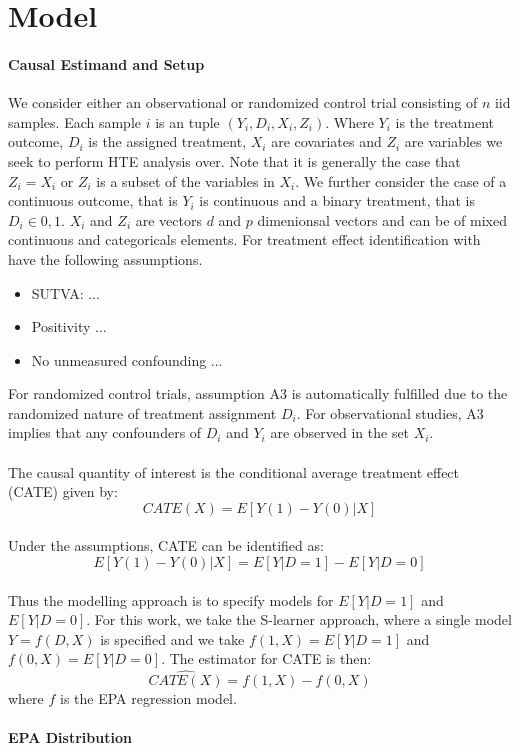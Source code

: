 \documentclass{article}
\begin{document}
\section{Model}
\label{sec:Model}
\paragraph{Causal Estimand and Setup} We consider either an observational or randomized control trial consisting of $n$ iid samples. Each sample $i$ is an tuple $(Y_i, D_i, X_i, Z_i)$. Where $Y_i$ is the treatment outcome, $D_i$ is the assigned treatment, $X_i$ are covariates and $Z_i$ are variables we seek to perform HTE analysis over. Note that it is generally the case that $Z_i = X_i$ or $Z_i$ is a subset of the variables in $X_i$. We further consider the case of a continuous outcome, that is $Y_i$ is continuous and a binary treatment, that is $D_i \in {0,1}$. $X_i$ and $Z_i$ are vectors $d$ and $p$ dimenionsal vectors and can be of mixed continuous and categoricals elements. For treatment effect identification with have the following assumptions.
\begin{itemize}
    \item SUTVA: ...
    \item Positivity ... 
    \item No unmeasured confounding ...
\end{itemize}
For randomized control trials, assumption A3 is automatically fulfilled due to the randomized nature of treatment assignment $D_i$. For observational studies, A3 implies that any confounders of $D_i$ and $Y_i$ are observed in the set $X_i$. 
\\ \\
The causal quantity of interest is the conditional average treatment effect (CATE) given by:
$$CATE(X) = E[Y(1)-Y(0)|X]$$ 
\\ 
Under the assumptions, CATE can be identified as:
$$E[Y(1)-Y(0)|X] = E[Y|D=1] - E[Y|D=0]$$ 
\\ 
Thus the modelling approach is to specify models for $E[Y|D=1]$ and $E[Y|D=0]$. For this work, we take the S-learner approach, where a single model $Y=f(D,X)$ is specified and we take $f(1,X) = E[Y|D=1]$ and $f(0,X) = E[Y|D=0]$. The estimator for CATE is then:
$$\widehat{CATE(X)} = f(1,X) - f(0,X)$$ 
where $f$ is the EPA regression model.

\paragraph{EPA Distribution}
\end{document}
